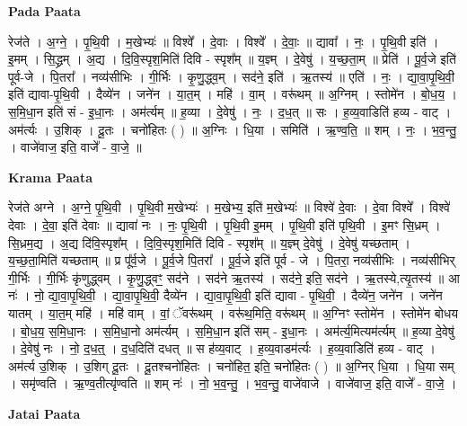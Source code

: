 \documentclass[17pt]{extarticle}
\begin{document}
\textbf{Pada Paata} \newline

रेज॑ते । अ॒ग्ने॒ । पृ॒थि॒वी । म॒खेभ्यः॑ ॥ विश्वे᳚ । दे॒वाः । विश्वे᳚ । दे॒वाः॒ ॥ द्यावा᳚ । नः॒ । पृ॒थि॒वी इति॑ । इ॒मम् । सि॒द्ध्रम् । अ॒द्य । दि॒वि॒स्पृश॒मिति॑ दिवि - स्पृश᳚म् ॥ य॒ज्ञ्म् । दे॒वेषु॑ । य॒च्छ॒ता॒म् ॥ प्रेति॑ । पू॒र्व॒जे इति॑ पूर्व-जे । पि॒तरा᳚ । नव्य॑सीभिः । गी॒र्भिः । कृ॒णु॒द्ध्व॒म् । सद॑ने॒ इति॑ । ऋ॒तस्य॑ ॥ एति॑ । नः॒ । द्या॒वा॒पृ॒थि॒वी॒ इति॑ द्यावा-पृ॒थि॒वी । दैव्ये॑न । जने॑न । या॒त॒म् । महि॑ । वा॒म् । वरू॑थम् ॥ अ॒ग्निम् । स्तोमे॑न । बो॒ध॒य॒ । स॒मि॒धा॒न इति॑ सं - इ॒धा॒नः । अम॑र्त्यम् ॥ ह॒व्या । दे॒वेषु॑ । नः॒ । द॒ध॒त् ॥ सः । ह॒व्य॒वाडिति॑ हव्य - वाट् । अम॑र्त्यः । उ॒शिक् । दू॒तः । चनो॑हितः ( ) ॥ अ॒ग्निः । धि॒या । समिति॑ । ऋ॒ण्व॒ति॒ ॥ शम् । नः॒ । भ॒व॒न्तु॒ । वाजे॑वाज॒ इति॒ वाजे᳚ - वा॒जे॒ ॥  \newline


\textbf{Krama Paata} \newline

रेज॑ते अग्ने । अ॒ग्ने॒ पृ॒थि॒वी । पृ॒थि॒वी म॒खेभ्यः॑ । म॒खेभ्य॒ इति॑ म॒खेभ्यः॑ ॥ विश्वे॑ दे॒वाः । दे॒वा विश्वे᳚ । विश्वे॑ देवाः । दे॒वा॒ इति॑ देवाः ॥ द्यावा॑ नः । नः॒ पृ॒थि॒वी । पृ॒थि॒वी इ॒मम् । पृ॒थि॒वी इति॑ पृथि॒वी । इ॒मꣳ सि॒ध्रम् । सि॒ध्रम॒द्य । अ॒द्य दि॑वि॒स्पृश᳚म् । दि॒वि॒स्पृश॒मिति॑ दिवि - स्पृश᳚म् ॥ य॒ज्ञ्म् दे॒वेषु॑ । दे॒वेषु॑ यच्छताम् । य॒च्छ॒ता॒मिति॑ यच्छताम् ॥ प्र पू᳚र्व॒जे । पू॒र्व॒जे पि॒तरा᳚ । पू॒र्व॒जे इति॑ पूर्व - जे । पि॒तरा॒ नव्य॑सीभिः । नव्य॑सीभिर् गी॒र्भिः । गी॒र्भिः कृ॑णुद्ध्वम् । कृ॒णु॒द्ध्वꣳ॒॒ सद॑ने । सद॑ने ऋ॒तस्य॑ । सद॑ने॒ इति॒ सद॑ने । ऋ॒तस्ये,त्यृ॒तस्य॑ ॥ आ नः॑ । नो॒ द्या॒वा॒पृ॒थि॒वी॒ । द्या॒वा॒पृ॒थि॒वी॒ दैव्ये॑न । द्या॒वा॒पृ॒थि॒वी॒ इति॑ द्यावा - पृ॒थि॒वी॒ । दैव्ये॑न॒ जने॑न । जने॑न यातम् । या॒त॒म् महि॑ । महि॑ वाम् । वां॒ ॅवरू॑थम् । वरू॑थ॒मिति॒ वरू॑थम् ॥ अ॒ग्निꣳ स्तोमे॑न । स्तोमे॑न बोधय । बो॒ध॒य॒ स॒मि॒धा॒नः । स॒मि॒धा॒नो अम॑र्त्यम् । स॒मि॒धा॒न इति॑ सम् - इ॒धा॒नः । अम॑र्त्य॒मित्यम॑र्त्यम् ॥ ह॒व्या दे॒वेषु॑ । दे॒वेषु॑ नः । नो॒ द॒ध॒त्॒ । द॒ध॒दिति॑ दधत् ॥ स ह॑व्य॒वाट् । ह॒व्य॒वाडम॑र्त्यः । ह॒व्य॒वाडिति॑ हव्य - वाट् । अम॑र्त्य उ॒शिक् । उ॒शिग् दू॒तः । दू॒तश्चनो॑हितः । चनो॑हित॒ इति॒ चनो॑हितः ( ) ॥ अ॒ग्निर् धि॒या । धि॒या सम् । समृ॑ण्वति । ऋ॒ण्व॒तीत्यृ॑ण्वति ॥ शम् नः॑ । नो॒ भ॒व॒न्तु॒ । भ॒व॒न्तु॒ वाजे॑वाजे । वाजे॑वाज॒ इति॒ वाजे᳚ - वा॒जे॒ । \newline

\textbf{Jatai Paata} \newline
\end{document}
